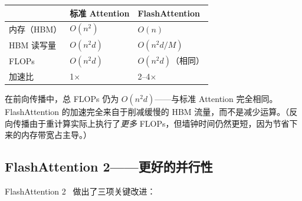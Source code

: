 \begin{keybox}
\begin{center}
\begin{tabular}{@{}l l l@{}}
\toprule
 & \textbf{标准 Attention} & \textbf{FlashAttention} \\
\midrule
内存（HBM） & $O(n^2)$ & $O(n)$ \\
HBM 读写量 & $O(n^2 d)$ & $O(n^2 d / M)$ \\
FLOPs & $O(n^2 d)$ & $O(n^2 d)$（相同） \\
加速比 & 1$\times$ & 2--4$\times$ \\
\bottomrule
\end{tabular}
\end{center}

在前向传播中，总 FLOPs 仍为 $O(n^2 d)$——与标准 Attention 完全相同。FlashAttention 的加速完全来自于削减缓慢的 HBM 流量，而不是减少运算。（反向传播由于重计算实际上执行了\emph{更多} FLOPs，但墙钟时间仍然更短，因为节省下来的内存带宽占主导。）
\end{keybox}

\subsection{FlashAttention 2——更好的并行性}
\label{flash-attention-2-better-parallelism}

FlashAttention 2~\cite{dao2023flashattention2} 做出了三项关键改进：

